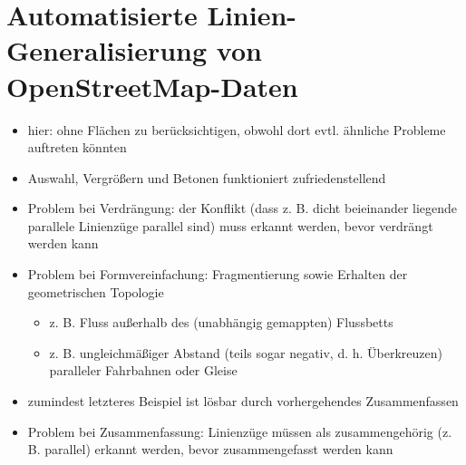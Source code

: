 \documentclass{../thesis}
\begin{document}


\section{Automatisierte Linien-Generalisierung von OpenStreetMap-Daten}

\begin{itemize}
	\item hier: ohne Flächen zu berücksichtigen, obwohl dort evtl. ähnliche Probleme auftreten könnten
	\item Auswahl, Vergrößern und Betonen funktioniert zufriedenstellend
	\item Problem bei Verdrängung: der Konflikt (dass z. B. dicht beieinander liegende parallele Linienzüge parallel sind) muss erkannt werden, bevor verdrängt werden kann
	\item Problem bei Formvereinfachung: Fragmentierung sowie Erhalten der geometrischen Topologie
	\begin{itemize}
		\item z. B. Fluss außerhalb des (unabhängig gemappten) Flussbetts \cite{Kla11}
		\item z. B. ungleichmäßiger Abstand (teils sogar negativ, d. h. Überkreuzen) paralleler Fahrbahnen oder Gleise
	\end{itemize}
	\item zumindest letzteres Beispiel ist lösbar durch vorhergehendes Zusammenfassen
	\item Problem bei Zusammenfassung: Linienzüge müssen als zusammengehörig (z. B. parallel) erkannt werden, bevor zusammengefasst werden kann
\end{itemize}
\end{document}
